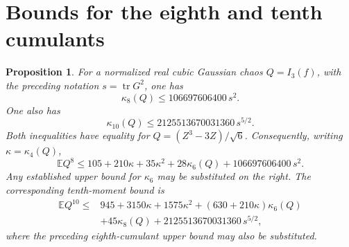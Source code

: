 \documentclass[11pt]{article}
\newtheorem{proposition}{Proposition}
\begin{document}
\section{Bounds for the eighth and tenth cumulants}\label{app:higher-cumulants}
\begin{proposition}\label{prop:cubic-eighth-cumulant}
For a normalized real cubic Gaussian chaos $Q=I_3(f)$, with the preceding
notation $s=\operatorname{tr}G^2$, one has
\begin{equation*}
 \kappa_8(Q)\le106697606400\,s^2.
\end{equation*}
One also has
\begin{equation*}
 \kappa_{10}(Q)\le2125513670031360\,s^{5/2}.
\end{equation*}
Both inequalities have equality for $Q=(Z^3-3Z)/\sqrt6$.
Consequently, writing $\kappa=\kappa_4(Q)$,
\begin{equation*}
 \mathbb EQ^8\le105+210\kappa+35\kappa^2
             +28\kappa_6(Q)+106697606400\,s^2.
\end{equation*}
Any established upper bound for $\kappa_6$ may be substituted on the right.
The corresponding tenth-moment bound is
\begin{equation*}
 \begin{aligned}
 \mathbb EQ^{10}\le{}&945+3150\kappa+1575\kappa^2
 +(630+210\kappa)\kappa_6(Q)\\
 &+45\kappa_8(Q)+2125513670031360\,s^{5/2},
 \end{aligned}
\end{equation*}
where the preceding eighth-cumulant upper bound may also be substituted.
\end{proposition}
\end{document}
